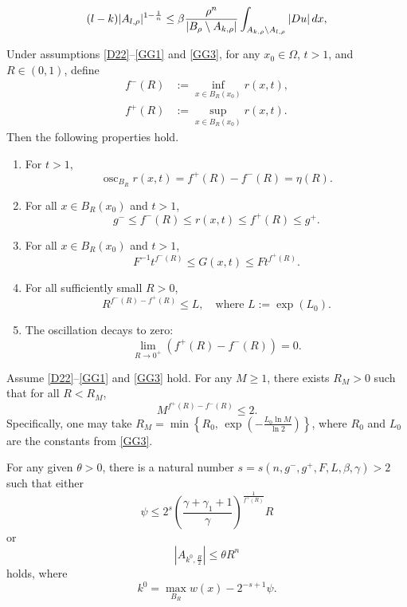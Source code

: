 \documentclass[10pt,a4paper]{amsart}
\begin{document}
\begin{equation}\label{2.2}
(l - k)|A_{l,\rho}|^{1-\frac{1}{n}} \leq \beta \frac{\rho^n}{|B_\rho \setminus A_{k,\rho}|} \int_{A_{k,\rho}\setminus A_{l,\rho}} |Du| \, {\rm d}x,
\end{equation}

\begin{lemma} \label{lem22}
Under assumptions \eqref{D22}--\eqref{GG1} and \eqref{GG3}, for any $x_0 \in \Omega$, $t > 1$, and $R \in (0,1)$, define
\begin{align*}
f^-(R) &:= \inf_{x \in B_R(x_0)} r(x, t), \\
f^+(R) &:= \sup_{x \in B_R(x_0)} r(x, t).
\end{align*}
Then the following properties hold.
\begin{enumerate}
\item[$(1)$] For $t>1$, $$\operatorname{osc}_{B_R}r(x,t)=f^+(R)-f^-(R)=\eta(R).$$
    \item[$(2)$] For all $x \in B_R(x_0)$ and $t > 1$,
          \[
          g^- \leq f^-(R) \leq r(x, t) \leq f^+(R) \leq g^+.
          \]
    \item[$(3)$] For all $x \in B_R(x_0)$ and $t > 1$,
          \[
          F^{-1} t^{f^-(R)} \leq G(x, t) \leq F t^{f^+(R)}.
          \]
    \item[$(4)$] For all sufficiently small $R > 0$,
          \[
          R^{f^-(R) - f^+(R)} \leq L, \quad \text{where } L := \exp(L_0).
          \]
    \item[$(5)$] The oscillation decays to zero:
          \[
          \lim_{R \to 0^+} \left( f^+(R) - f^-(R) \right) = 0.
          \]
\end{enumerate}
\end{lemma}

\begin{lemma} \label{remff}
Assume \eqref{D22}--\eqref{GG1} and \eqref{GG3} hold. For any $M \geq 1$, there exists $R_M > 0$ such that for all $R < R_M$,
\[
M^{f^+(R) - f^-(R)} \leq 2.
\]
Specifically, one may take $R_M = \min\left\{ R_0,\, \exp\left( -\frac{L_0 \ln M}{\ln 2} \right) \right\}$, where $R_0$ and $L_0$ are the constants from \eqref{GG3}.
\end{lemma}

\begin{lemma}\label{Lemma 2.6}
For any given \(\theta > 0\), there is a natural number \(s = s(n,g^-,g^+,F,L,\beta,\gamma) > 2\) such that either
\begin{equation}\label{2.29}
\psi \leq 2^s \left( \frac{\gamma + \gamma_1 + 1}{\gamma} \right)^{\frac{1}{f^+(R)}} R
\end{equation}
or
\begin{equation}\label{2.30}
|A_{k^0, \frac{R}{2}}| \leq \theta R^n
\end{equation}
hol{\rm d}s, where
\[
k^0 = \max_{B_R} w(x) - 2^{-s+1}\psi.
\]
\end{lemma}
\end{document}
